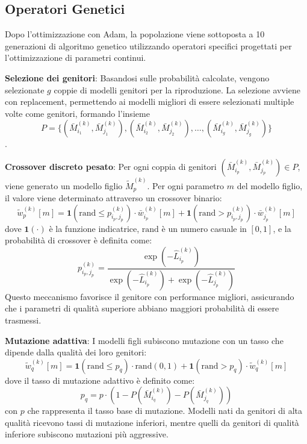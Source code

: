 \subsection{Operatori Genetici}
Dopo l'ottimizzazione con Adam, la popolazione viene sottoposta a 10 generazioni di algoritmo genetico utilizzando operatori specifici progettati per l'ottimizzazione di parametri continui.
\begin{compactitemize}
\item \textbf{Selezione dei genitori}: Basandosi sulle probabilità calcolate, vengono selezionate $g$ coppie di modelli genitori per la riproduzione. La selezione avviene con replacement, permettendo ai modelli migliori di essere selezionati multiple volte come genitori, formando l'insieme $$P = \{(\bar{M}_{i_1}^{(k)}, \bar{M}_{j_1}^{(k)}), (\bar{M}_{i_2}^{(k)}, \bar{M}_{j_2}^{(k)}), \ldots, (\bar{M}_{i_g}^{(k)}, \bar{M}_{j_g}^{(k)})\}$$.
\vspace{-2em}
\item \textbf{Crossover discreto pesato}: Per ogni coppia di genitori $(\bar{M}_{i_p}^{(k)}, \bar{M}_{j_p}^{(k)}) \in P$, viene generato un modello figlio $\tilde{M}_p^{(k)}$. Per ogni parametro $m$ del modello figlio, il valore viene determinato attraverso un crossover binario:
$$\tilde{w}_p^{(k)}[m] = \mathbf{1}(\text{rand} \leq p_{i_p,j_p}^{(k)}) \cdot \bar{w}_{i_p}^{(k)}[m] + \mathbf{1}(\text{rand} > p_{i_p,j_p}^{(k)}) \cdot \bar{w}_{j_p}^{(k)}[m]$$
dove $\mathbf{1}(\cdot)$ è la funzione indicatrice, $\text{rand}$ è un numero casuale in $[0,1]$, e la probabilità di crossover è definita come:
$$p_{i_p,j_p}^{(k)} = \frac{\exp(-\hat{L}_{i_p}^{(k)})}{\exp(-\hat{L}_{i_p}^{(k)}) + \exp(-\hat{L}_{j_p}^{(k)})}$$
Questo meccanismo favorisce il genitore con performance migliori, assicurando che i parametri di qualità superiore abbiano maggiori probabilità di essere trasmessi.

\item \textbf{Mutazione adattiva}: I modelli figli subiscono mutazione con un tasso che dipende dalla qualità dei loro genitori:
$$\tilde{w}_q^{(k)}[m] = \mathbf{1}(\text{rand} \leq p_q) \cdot \text{rand}(0,1) + \mathbf{1}(\text{rand} > p_q) \cdot \tilde{w}_q^{(k)}[m]$$
dove il tasso di mutazione adattivo è definito come:
$$p_q = p \cdot \left(1 - P(\bar{M}_{i_q}^{(k)}) - P(\bar{M}_{j_q}^{(k)})\right)$$
con $p$ che rappresenta il tasso base di mutazione. Modelli nati da genitori di alta qualità ricevono tassi di mutazione inferiori, mentre quelli da genitori di qualità inferiore subiscono mutazioni più aggressive.
\end{compactitemize}
